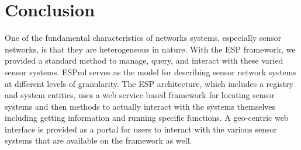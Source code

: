 \section{Conclusion}
One of the fundamental characteristics of networks systems, especially sensor networks, is that they are heterogeneous in nature.  With the ESP
framework, we provided a standard method to manage, query, and interact with these varied sensor systems.  ESPml serves
as the model for describing sensor network systems at different levels of granularity.  The ESP architecture, which
includes a registry and system entities, uses
a web service based framework for locating sensor systems and then methods to actually interact with the systems themselves
including getting information and running specific functions.  A geo-centric web interface is provided as a portal for users
to interact with the various sensor systems that are available on the framework as well.

